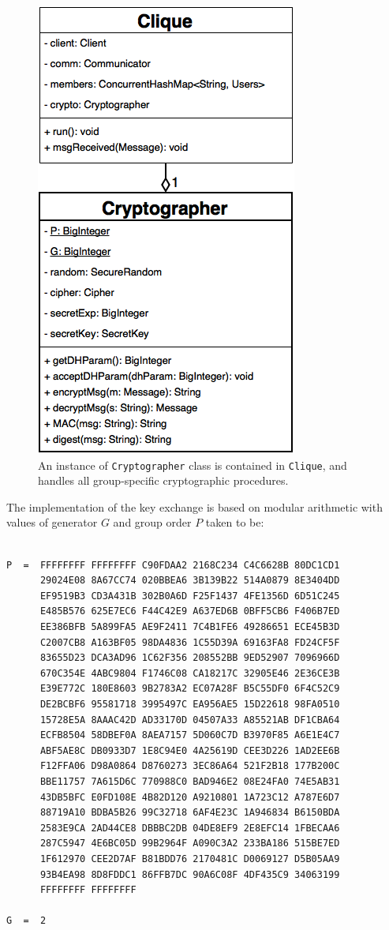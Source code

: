 \documentclass[a4paper, twoside, 12pt]{report}
\begin{document}

\begin{figure}[H]
    \captionsetup{width=0.76\textwidth}
    \centering
    \includegraphics[width=0.4\linewidth]{pics/crypto_uml.png}
    \caption{\label{fig:crypto_uml} An instance of \texttt{Cryptographer} class is contained in \texttt{Clique}, and handles all group-specific cryptographic procedures.}
\end{figure}

The implementation of the key exchange is based on modular arithmetic with values of generator $G$ and group order $P$ taken to be:

\begin{lstlisting}[numbers=none, frame=none, xleftmargin=1.5cm, xrightmargin=0cm, columns=fullflexible]

P  =  FFFFFFFF FFFFFFFF C90FDAA2 2168C234 C4C6628B 80DC1CD1
      29024E08 8A67CC74 020BBEA6 3B139B22 514A0879 8E3404DD
      EF9519B3 CD3A431B 302B0A6D F25F1437 4FE1356D 6D51C245
      E485B576 625E7EC6 F44C42E9 A637ED6B 0BFF5CB6 F406B7ED
      EE386BFB 5A899FA5 AE9F2411 7C4B1FE6 49286651 ECE45B3D
      C2007CB8 A163BF05 98DA4836 1C55D39A 69163FA8 FD24CF5F
      83655D23 DCA3AD96 1C62F356 208552BB 9ED52907 7096966D
      670C354E 4ABC9804 F1746C08 CA18217C 32905E46 2E36CE3B
      E39E772C 180E8603 9B2783A2 EC07A28F B5C55DF0 6F4C52C9
      DE2BCBF6 95581718 3995497C EA956AE5 15D22618 98FA0510
      15728E5A 8AAAC42D AD33170D 04507A33 A85521AB DF1CBA64
      ECFB8504 58DBEF0A 8AEA7157 5D060C7D B3970F85 A6E1E4C7
      ABF5AE8C DB0933D7 1E8C94E0 4A25619D CEE3D226 1AD2EE6B
      F12FFA06 D98A0864 D8760273 3EC86A64 521F2B18 177B200C
      BBE11757 7A615D6C 770988C0 BAD946E2 08E24FA0 74E5AB31
      43DB5BFC E0FD108E 4B82D120 A9210801 1A723C12 A787E6D7
      88719A10 BDBA5B26 99C32718 6AF4E23C 1A946834 B6150BDA
      2583E9CA 2AD44CE8 DBBBC2DB 04DE8EF9 2E8EFC14 1FBECAA6
      287C5947 4E6BC05D 99B2964F A090C3A2 233BA186 515BE7ED
      1F612970 CEE2D7AF B81BDD76 2170481C D0069127 D5B05AA9
      93B4EA98 8D8FDDC1 86FFB7DC 90A6C08F 4DF435C9 34063199
      FFFFFFFF FFFFFFFF
      
G  =  2
\end{lstlisting}
\restoregeometry
\end{document}
